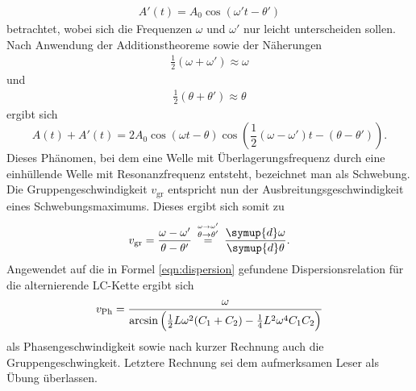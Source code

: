 \begin{align*}
A'(t) = A_0 \cos{(\omega' t - \theta')}
\end{align*}
betrachtet, wobei sich die Frequenzen $\omega$ und $\omega'$ nur leicht unterscheiden sollen.
Nach Anwendung der Additionstheoreme sowie der Näherungen
\begin{align*}
  \frac{1}{2}(\omega + \omega') \approx \omega
\end{align*}
und
\begin{align*}
  \frac{1}{2}(\theta + \theta') \approx \theta
\end{align*}
ergibt sich
\begin{equation}
A(t) + A'(t) = 2 A_0 \cos{(\omega t - \theta)} \cos{(\frac{1}{2} (\omega - \omega')t - (\theta - \theta'))}.
\end{equation}
Dieses Phänomen, bei dem eine Welle mit Überlagerungsfrequenz durch eine einhüllende Welle mit Resonanzfrequenz entsteht, bezeichnet man als Schwebung.
Die Gruppengeschwindigkeit $v_{\text{gr}}$ entspricht nun der Ausbreitungsgeschwindigkeit eines Schwebungsmaximums.
Dieses ergibt sich somit zu
\begin{equation}
  \label{eqn:gruppe}
  v_{\text{gr}} = \frac{\omega - \omega'}{\theta - \theta'} \: \stackrel{\stackrel{\omega \to \omega'}{\theta \to \theta'}}{=} \: \frac{\symup{d}\omega}{\symup{d}\theta}.
\end{equation}
Angewendet auf die in Formel \ref{eqn:dispersion} gefundene Dispersionsrelation für die alternierende LC-Kette ergibt sich
\begin{equation}
  v_{\text{Ph}} = \frac{\omega}{\arcsin{\Bigl( \frac{1}{2} L \omega^2 (C_1 + C_2) - \frac{1}{4} L^2 \omega^4 C_1 C_2   \Bigr)}}
\end{equation}
als Phasengeschwindigkeit sowie nach kurzer Rechnung auch die Gruppengeschwingkeit.
Letztere Rechnung sei dem aufmerksamen Leser als Übung überlassen.
